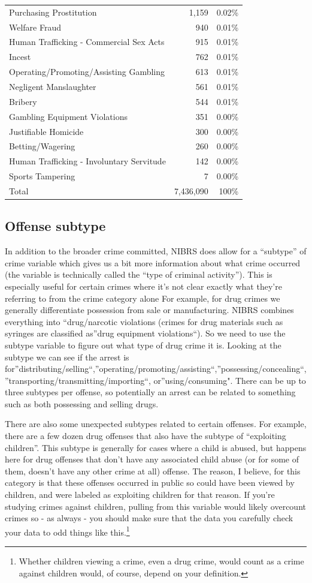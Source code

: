\documentclass[
  12pt,
  openany]{book}
\begin{document}
\begin{longtable}[]{@{}lrr@{}}
Purchasing Prostitution & 1,159 & 0.02\%\tabularnewline
Welfare Fraud & 940 & 0.01\%\tabularnewline
Human Trafficking - Commercial Sex Acts & 915 & 0.01\%\tabularnewline
Incest & 762 & 0.01\%\tabularnewline
Operating/Promoting/Assisting Gambling & 613 & 0.01\%\tabularnewline
Negligent Manslaughter & 561 & 0.01\%\tabularnewline
Bribery & 544 & 0.01\%\tabularnewline
Gambling Equipment Violations & 351 & 0.00\%\tabularnewline
Justifiable Homicide & 300 & 0.00\%\tabularnewline
Betting/Wagering & 260 & 0.00\%\tabularnewline
Human Trafficking - Involuntary Servitude & 142 & 0.00\%\tabularnewline
Sports Tampering & 7 & 0.00\%\tabularnewline
Total & 7,436,090 & 100\%\tabularnewline
\bottomrule
\end{longtable}

\hypertarget{offense-subtype}{%
\subsection{Offense subtype}\label{offense-subtype}}

In addition to the broader crime committed, NIBRS does allow for a ``subtype'' of crime variable which gives us a bit more information about what crime occurred (the variable is technically called the ``type of criminal activity''). This is especially useful for certain crimes where it's not clear exactly what they're referring to from the crime category alone For example, for drug crimes we generally differentiate possession from sale or manufacturing. NIBRS combines everything into ``drug/narcotic violations (crimes for drug materials such as syringes are classified as''drug equipment violations``). So we need to use the subtype variable to figure out what type of drug crime it is. Looking at the subtype we can see if the arrest is for''distributing/selling``,''operating/promoting/assisting``,''possessing/concealing``,''transporting/transmitting/importing``, or''using/consuming". There can be up to three subtypes per offense, so potentially an arrest can be related to something such as both possessing and selling drugs.

There are also some unexpected subtypes related to certain offenses. For example, there are a few dozen drug offenses that also have the subtype of ``exploiting children''. This subtype is generally for cases where a child is abused, but happens here for drug offenses that don't have any associated child abuse (or for some of them, doesn't have any other crime at all) offense. The reason, I believe, for this category is that these offenses occurred in public so could have been viewed by children, and were labeled as exploiting children for that reason. If you're studying crimes against children, pulling from this variable would likely overcount crimes so - as always - you should make sure that the data you carefully check your data to odd things like this.\footnote{Whether children viewing a crime, even a drug crime, would count as a crime against children would, of course, depend on your definition.}
\end{document}
